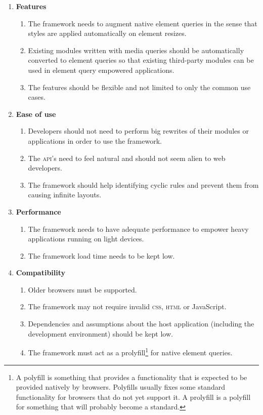 \documentclass[a4paper,11pt]{kth-mag}
\begin{document}
        \begin{enumerate}
          \item \textbf{Features}
            \begin{enumerate}
              \item\label{itm:req_resize_detect} The framework needs to augment native element queries in the sense that styles are applied automatically on element resizes.
              \item Existing modules written with media queries should be automatically converted to element queries so that existing third-party modules can be used in element query empowered applications.
              \item The features should be flexible and not limited to only the common use cases.
            \end{enumerate}
          \item \textbf{Ease of use}
            \begin{enumerate}
              \item\label{itm:req_big_rewrite} Developers should not need to perform big rewrites of their modules or applications in order to use the framework.
              \item\label{itm:natural} The \textsc{api}'s need to feel natural and should not seem alien to web developers.
              \item The framework should help identifying cyclic rules and prevent them from causing infinite layouts.
            \end{enumerate}
          \item \textbf{Performance}
            \begin{enumerate}
              \item The framework needs to have adequate performance to empower heavy applications running on light devices.
              \item The framework load time needs to be kept low.
            \end{enumerate}
          \item \textbf{Compatibility}
            \begin{enumerate}
              \item Older browsers must be supported.
              \item The framework may not require invalid \textsc{css}, \textsc{html} or JavaScript.
              \item\label{itm:assumption} Dependencies and assumptions about the host application (including the development environment) should be kept low.
              \item\label{itm:req_prolyfill} The framework must act as a prolyfill\footnote{A polyfill is something that provides a functionality that is expected to be provided natively by browsers. Polyfills usually fixes some standard functionality for browsers that do not yet support it. A prolyfill is a polyfill for something that will probably become a standard.} for native element queries.
            \end{enumerate}
        \end{enumerate}
\end{document}
